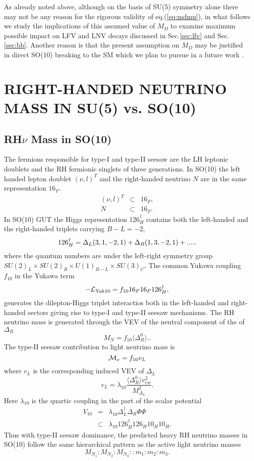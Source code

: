 \documentclass[a4paper,11pt]{article}
\newcommand{\be}{\begin{equation}}
\newcommand{\ee}{\end{equation}}
\newcommand{\bea}{\begin{eqnarray}}
\newcommand{\eea}{\end{eqnarray}}
\begin{document}
As already noted above, although on the basis of SU(5) symmetry alone there may not be any reason for the rigorous validity of eq.(\ref{eq:mdmu}), in what follows  we study the implications of this assumed value of $M_D$ to examine maximum possible impact on LFV and LNV decays discussed in Sec.\ref{sec:lfv} and Sec.\ref{sec:bb}. Another
reason is that the present assumption on $M_D$ may be justified in direct SO(10)
breaking to the SM which we plan to pursue in a future work \cite{mkp-rs:plan}.


\section{RIGHT-HANDED NEUTRINO  MASS IN SU(5) vs. SO(10)}\label{sec:rhnu}
\subsection{RH$\nu$ Mass in SO(10)}
The fermions responsible for type-I and type-II  seesaw are the  LH
leptonic doublets and the RH fermionic singlets of three generations.
 In SO(10) the left handed lepton doublet  $(\nu, l)^T$
and the right-handed neutrino $N$ are in the same representation ${16}_F$.
\bea
(\nu, l)^T & \subset & {16}_F,\nonumber\\
N& \subset & {16}_F.\label{eq:fermiso10}
\eea
In SO(10) GUT the Higgs representation ${126}^{\dagger}_H$ contains  both the left-handed and the right-handed triplets carrying $B-L=-2$,
\be
{126}^{\dagger}_H=\Delta_L(3,1,-2,1)+\Delta_R(1,3,-2,1)+.....\label{eq:126h}\\
\ee
where the quantum numbers are under the left-right symmetry group $SU(2)_L\times SU(2)_R \times U(1)_{B-L}\times SU(3)_C$. 
The common Yukawa coupling $f_{10}$ in the Yukawa term
\be
-{\cal L}_{\rm Yuk10}=  f_{10} {16}_F{16}_F{126}_H^{\dagger},\label{eq:Yuk10}
\ee
 generates the dilepton-Higgs triplet interactios both in the left-handed and right-handed sectors giving rise to type-I and type-II seesaw mechanisms.
The RH neutrino mass is generated through the VEV of the neutral component of the of $\Delta_R$
\be
M_N=f_{10} \langle \Delta_R^0 \rangle .\label{eq:MNso10}.
\ee
The type-II seesaw contribution to light  neutrino mass is 
\be
{\cal M}_{\nu}=f_{10} v_L  \label{eq:t2so10}
\ee
where $v_L$ is the corresponding induced VEV of $\Delta_L$
\be
v_L=\lambda_{10}\frac{\langle \Delta_R^0\rangle v^2_{ew}}{M_{\Delta_L}^2}. \label{eq:vlso10}
\ee
Here $\lambda_{10}$ is the quartic coupling in the part of the scalar
potential
\bea
 V_{10}&=&\lambda_{10}\Delta_L^{\dagger}\Delta_R \Phi \Phi \nonumber\\
&\subset& \lambda_{10}{126}_H^{\dagger}{126}_{H}{10}_H{10}_H.\label{eq:v10}
\eea 
Thus with type-II seesaw dominance, the predicted heavy RH neutrino masses in SO(10)  follow the same hierarchical pattern as the active light neutrino masses
\be
M_{N_1}:M_{N_2}:M_{N_3}::m_1:m_2:m_3 .\label{eq:rhmso10}
\ee
\end{document}
